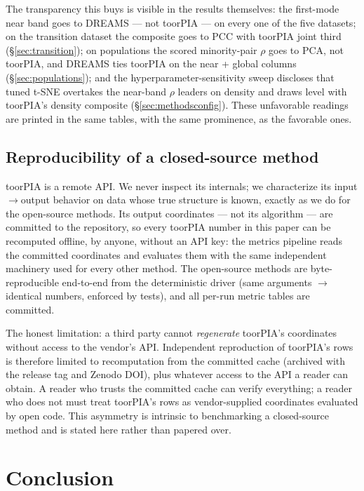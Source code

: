 \documentclass[11pt]{article}
\begin{document}
The transparency this buys is visible in the results themselves: the
first-mode near band goes to DREAMS --- not toorPIA --- on every
one of the five datasets; on the transition dataset the composite goes to
PCC with toorPIA joint third (\S\ref{sec:transition}); on populations the
scored minority-pair $\rho$ goes to PCA, not toorPIA, and DREAMS ties toorPIA
on the near + global columns (\S\ref{sec:populations}); and the
hyperparameter-sensitivity
sweep discloses that tuned t-SNE overtakes the near-band $\rho$ leaders on
density and draws level with toorPIA's density composite
(\S\ref{sec:methodsconfig}). These unfavorable readings are printed
in the same tables, with the same prominence, as the favorable ones.

\subsection{Reproducibility of a closed-source method}
\label{sec:reproducibility}

toorPIA is a remote API. We never inspect its internals; we characterize its
input$\to$output behavior on data whose true structure is known, exactly as
we do for the open-source methods. Its output coordinates --- not its
algorithm --- are committed to the repository, so every toorPIA number in
this paper can be recomputed offline, by anyone, without an API key: the
metrics pipeline reads the committed coordinates and evaluates them with the
same independent machinery used for every other method. The open-source
methods are byte-reproducible end-to-end from the deterministic driver (same
arguments $\to$ identical numbers, enforced by tests), and all per-run
metric tables are committed.

The honest limitation: a third party cannot \emph{regenerate} toorPIA's
coordinates without access to the vendor's API. Independent reproduction of
toorPIA's rows is therefore limited to recomputation from the committed
cache (archived with the release tag and Zenodo DOI), plus whatever access
to the API a reader can obtain. A reader who trusts the committed cache can
verify everything; a reader who does not must treat toorPIA's rows as
vendor-supplied coordinates evaluated by open code. This asymmetry is
intrinsic to benchmarking a closed-source method and is stated here rather
than papered over.

\section{Conclusion}
\label{sec:conclusion}
\end{document}

